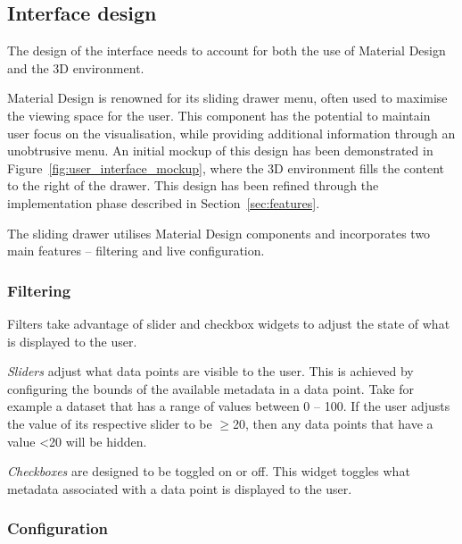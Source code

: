 {{	}

	\subsection{Interface design} {
	\label{sec:interface_design}

		The design of the interface needs to account for both the use of Material Design and the 3D environment. 

		Material Design is renowned for its sliding drawer menu, often used to maximise the viewing space for the user. This component has the potential to maintain user focus on the visualisation, while providing additional information through an unobtrusive menu. An initial mockup of this design has been demonstrated in Figure~\ref{fig:user_interface_mockup}, where the 3D environment fills the content to the right of the drawer. This design has been refined through the implementation phase described in Section~\ref{sec:features}.


		

		The sliding drawer utilises Material Design components and incorporates two main features -- filtering and live configuration.

		\subsubsection{Filtering} {
		\label{sec:filtering}

			Filters take advantage of slider and checkbox widgets to adjust the state of what is displayed to the user.

			\emph{Sliders} adjust what data points are visible to the user. This is achieved by configuring the bounds of the available metadata in a data point. Take for example a dataset that has a range of values between 0 -- 100. If the user adjusts the value of its respective slider to be $\ge$20, then any data points that have a value \textless20 will be hidden.
			
			\emph{Checkboxes} are designed to be toggled on or off. This widget toggles what metadata associated with a data point is displayed to the user.

		}

		\subsubsection{Configuration} {
		\label{sec:configuration}

}}}
